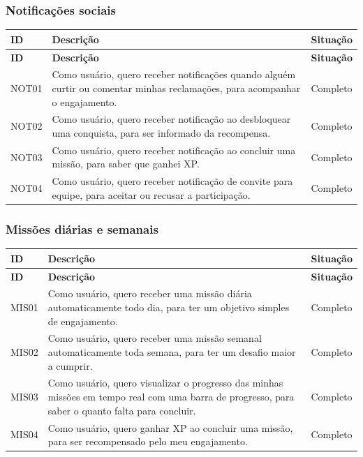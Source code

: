 \subsubsection{Notificações sociais}

\begin{longtable}{|p{2cm}|p{9cm}|p{2.5cm}|}
  \hline
  \textbf{ID} & \textbf{Descrição} & \textbf{Situação} \\
  \hline
  \endfirsthead
  \hline
  \textbf{ID} & \textbf{Descrição} & \textbf{Situação} \\
  \hline
  \endhead
  NOT01 & Como usuário, quero receber notificações quando alguém curtir ou comentar minhas reclamações, para acompanhar o engajamento. & Completo \\
  \hline
  NOT02 & Como usuário, quero receber notificação ao desbloquear uma conquista, para ser informado da recompensa. & Completo \\
  \hline
  NOT03 & Como usuário, quero receber notificação ao concluir uma missão, para saber que ganhei XP. & Completo \\
  \hline
  NOT04 & Como usuário, quero receber notificação de convite para equipe, para aceitar ou recusar a participação. & Completo \\
  \hline
\end{longtable}

\subsubsection{Missões diárias e semanais}

\begin{longtable}{|p{2cm}|p{9cm}|p{2.5cm}|}
  \hline
  \textbf{ID} & \textbf{Descrição} & \textbf{Situação} \\
  \hline
  \endfirsthead
  \hline
  \textbf{ID} & \textbf{Descrição} & \textbf{Situação} \\
  \hline
  \endhead
  MIS01 & Como usuário, quero receber uma missão diária automaticamente todo dia, para ter um objetivo simples de engajamento. & Completo \\
  \hline
  MIS02 & Como usuário, quero receber uma missão semanal automaticamente toda semana, para ter um desafio maior a cumprir. & Completo \\
  \hline
  MIS03 & Como usuário, quero visualizar o progresso das minhas missões em tempo real com uma barra de progresso, para saber o quanto falta para concluir. & Completo \\
  \hline
  MIS04 & Como usuário, quero ganhar XP ao concluir uma missão, para ser recompensado pelo meu engajamento. & Completo \\
  \hline
\end{longtable}

